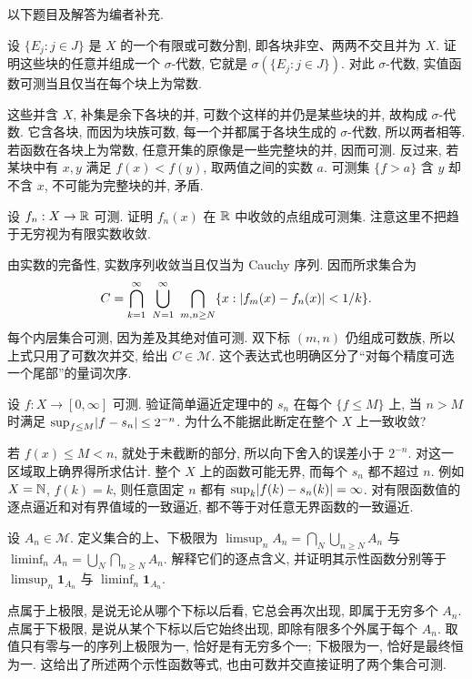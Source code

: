 以下题目及解答为编者补充.

\begin{exercise}
设 $\{E_j:j\in J\}$ 是 $X$ 的一个有限或可数分割, 即各块非空、两两不交且并为 $X$. 证明这些块的任意并组成一个 $\sigma$-代数, 它就是 $\sigma(\{E_j:j\in J\})$. 对此 $\sigma$-代数, 实值函数可测当且仅当在每个块上为常数.
\end{exercise}
\begin{solution}
这些并含 $X$, 补集是余下各块的并, 可数个这样的并仍是某些块的并, 故构成 $\sigma$-代数. 它含各块, 而因为块族可数, 每一个并都属于各块生成的 $\sigma$-代数, 所以两者相等. 若函数在各块上为常数, 任意开集的原像是一些完整块的并, 因而可测. 反过来, 若某块中有 $x,y$ 满足 $f(x)<f(y)$, 取两值之间的实数 $a$. 可测集 $\{f>a\}$ 含 $y$ 却不含 $x$, 不可能为完整块的并, 矛盾.
\end{solution}

\begin{exercise}
设 $f_n:X\to\mathbb R$ 可测. 证明 $f_n(x)$ 在 $\mathbb R$ 中收敛的点组成可测集. 注意这里不把趋于无穷视为有限实数收敛.
\end{exercise}
\begin{solution}
由实数的完备性, 实数序列收敛当且仅当为 Cauchy 序列. 因而所求集合为
\[
 C=\bigcap_{k=1}^{\infty}\ \bigcup_{N=1}^{\infty}\
    \bigcap_{m,n\ge N}\{x:\abs{f_m(x)-f_n(x)}<1/k\}.
\]
每个内层集合可测, 因为差及其绝对值可测. 双下标 $(m,n)$ 仍组成可数族, 所以上式只用了可数次并交, 给出 $C\in\mathcal M$. 这个表达式也明确区分了``对每个精度可选一个尾部''的量词次序.
\end{solution}

\begin{exercise}
设 $f:X\to[0,\infty]$ 可测. 验证简单逼近定理中的 $s_n$ 在每个 $\{f\le M\}$ 上, 当 $n>M$ 时满足 $\sup_{f\le M}\lvert f-s_n\rvert\le2^{-n}$. 为什么不能据此断定在整个 $X$ 上一致收敛?
\end{exercise}
\begin{solution}
若 $f(x)\le M<n$, 就处于未截断的部分, 所以向下舍入的误差小于 $2^{-n}$. 对这一区域取上确界得所求估计. 整个 $X$ 上的函数可能无界, 而每个 $s_n$ 都不超过 $n$. 例如 $X=\mathbb N$, $f(k)=k$, 则任意固定 $n$ 都有 $\sup_k\lvert f(k)-s_n(k)\rvert=\infty$. 对有限函数值的逐点逼近和对有界值域的一致逼近, 都不等于对任意无界函数的一致逼近.
\end{solution}

\begin{exercise}
设 $A_n\in\mathcal M$. 定义集合的上、下极限为 $\limsup_n A_n=\bigcap_N\bigcup_{n\ge N}A_n$ 与 $\liminf_n A_n=\bigcup_N\bigcap_{n\ge N}A_n$. 解释它们的逐点含义, 并证明其示性函数分别等于 $\limsup_n\mathbf1_{A_n}$ 与 $\liminf_n\mathbf1_{A_n}$.
\end{exercise}
\begin{solution}
点属于上极限, 是说无论从哪个下标以后看, 它总会再次出现, 即属于无穷多个 $A_n$. 点属于下极限, 是说从某个下标以后它始终出现, 即除有限多个外属于每个 $A_n$. 取值只有零与一的序列上极限为一, 恰好是有无穷多个一; 下极限为一, 恰好是最终恒为一. 这给出了所述两个示性函数等式, 也由可数并交直接证明了两个集合可测.
\end{solution}
